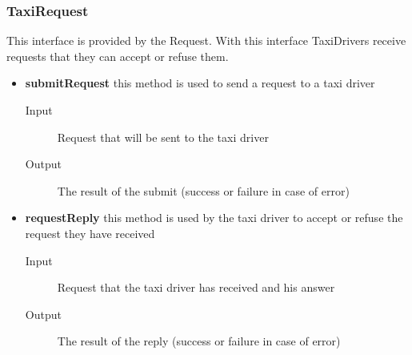 		\subsubsection{TaxiRequest} 
		This interface is provided by the Request. With this interface TaxiDrivers receive requests that they can accept or refuse them.
		\begin{itemize}
			\item \textbf{submitRequest} this method is used to send a request to a taxi driver
			\begin{description}
				\item[Input] Request that will be sent to the taxi driver
				\item[Output] The result of the submit (success or failure in case of error)
			\end{description}
			\item \textbf{requestReply} this method is used by the taxi driver to accept or refuse the request they have received
			\begin{description}
				\item[Input] Request that the taxi driver has received and his answer
				\item[Output] The result of the reply (success or failure in case of error)
			\end{description}
		\end{itemize}
